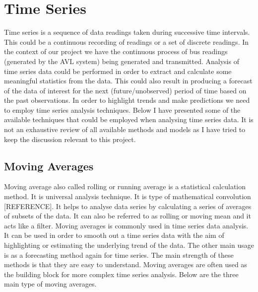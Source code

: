 \section{Time Series}
Time series is a sequence of data readings taken during successive time intervals. This could be a continuous recording of readings or a set of discrete readings. In the context of our project we have the continuous process of bus readings (generated by the AVL system) being generated and transmitted. Analysis of time series data could be performed in order to extract and calculate some meaningful statistics from the data. This could also result in producing a forecast of the data of interest for the next (future/unobserved) period of time based on the past observations. In order to highlight trends and make predictions we need to employ time series analysis techniques. Below I have presented some of the available techniques that could be employed when analysing time series data. It is not an exhaustive review of all available methods and models as I have tried to keep the discussion relevant to this project.


\subsection{Moving Averages}
Moving average also called rolling or running average is a statistical calculation method. It is universal analysis technique. It is type of mathematical convolution [REFERENCE]. It helps to analyse data series by calculating a series of averages of subsets of the data. It can also be referred to as rolling or moving mean and it acts like a filter. Moving averages is commonly used in time series data analysis. It can be used in order to smooth out  a time series data with the aim of highlighting or estimating the underlying trend of the data. The other main usage is as a forecasting method again for time series. The main strength of these methods is that they are easy to understand.  Moving averages are often used as the building block for more complex time series analysis. Below are the three main type of moving averages.

